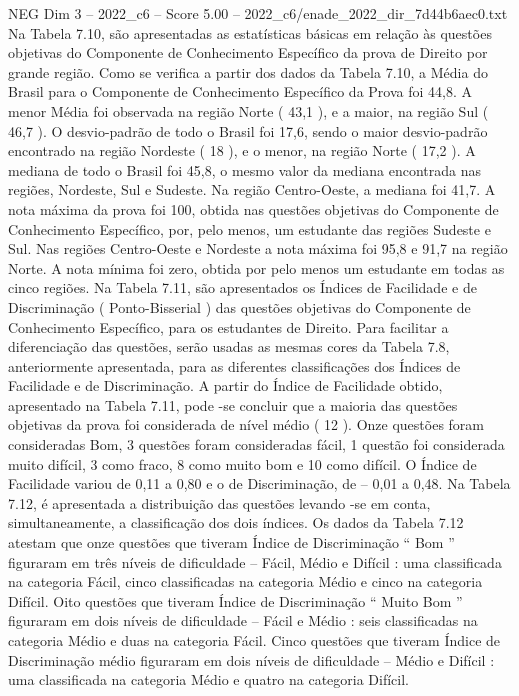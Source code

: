\begin{textsample}{NEG Dim 3 – 2022\_c6 – Score 5.00 – 2022\_c6/enade\_2022\_dir\_7d44b6aec0.txt}
Na Tabela 7.10, são apresentadas as estatísticas básicas em relação às questões objetivas do Componente de Conhecimento Específico da prova de Direito por grande região.
Como se verifica a partir dos dados da Tabela 7.10, a Média do Brasil para o Componente de Conhecimento Específico da Prova foi 44,8.
A menor Média foi observada na região Norte ( 43,1 ), e a maior, na região Sul ( 46,7 ).
O desvio-padrão de todo o Brasil foi 17,6, sendo o maior desvio-padrão encontrado na região Nordeste ( 18 ), e o menor, na região Norte ( 17,2 ).
A mediana de todo o Brasil foi 45,8, o mesmo valor da mediana encontrada nas regiões, Nordeste, Sul e Sudeste.
Na região Centro-Oeste, a mediana foi 41,7.
A nota máxima da prova foi 100, obtida nas questões objetivas do Componente de Conhecimento Específico, por, pelo menos, um estudante das regiões Sudeste e Sul.
Nas regiões Centro-Oeste e Nordeste a nota máxima foi 95,8 e 91,7 na região Norte.
A nota mínima foi zero, obtida por pelo menos um estudante em todas as cinco regiões.
Na Tabela 7.11, são apresentados os Índices de Facilidade e de Discriminação ( Ponto-Bisserial ) das questões objetivas do Componente de Conhecimento Específico, para os estudantes de Direito.
Para facilitar a diferenciação das questões, serão usadas as mesmas cores da Tabela 7.8, anteriormente apresentada, para as diferentes classificações dos Índices de Facilidade e de Discriminação.
A partir do Índice de Facilidade obtido, apresentado na Tabela 7.11, pode -se concluir que a maioria das questões objetivas da prova foi considerada de nível médio ( 12 ).
Onze questões foram consideradas Bom, 3 questões foram consideradas fácil, 1 questão foi considerada muito difícil, 3 como fraco, 8 como muito bom e 10 como difícil.
O Índice de Facilidade variou de 0,11 a 0,80 e o de Discriminação, de – 0,01 a 0,48.
Na Tabela 7.12, é apresentada a distribuição das questões levando -se em conta, simultaneamente, a classificação dos dois índices.
Os dados da Tabela 7.12 atestam que onze questões que tiveram Índice de Discriminação “ Bom ” figuraram em três níveis de dificuldade – Fácil, Médio e Difícil : uma classificada na categoria Fácil, cinco classificadas na categoria Médio e cinco na categoria Difícil.
Oito questões que tiveram Índice de Discriminação “ Muito Bom ” figuraram em dois níveis de dificuldade – Fácil e Médio : seis classificadas na categoria Médio e duas na categoria Fácil.
Cinco questões que tiveram Índice de Discriminação médio figuraram em dois níveis de dificuldade – Médio e Difícil : uma classificada na categoria Médio e quatro na categoria Difícil.

\end{textsample}
